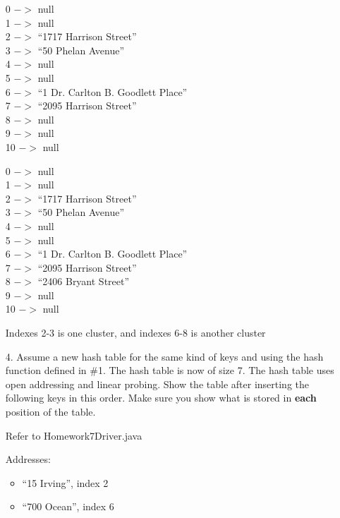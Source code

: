\documentclass[10pt]{article}
\begin{document}
\begin{enumerate}
			\vspace{0.5cm}
			0 $->$ null\\
			1 $->$ null\\
			2 $->$ ``1717 Harrison Street''\\
			3 $->$ ``50 Phelan Avenue''\\
			4 $->$ null\\
			5 $->$ null\\
			6 $->$ ``1 Dr. Carlton B. Goodlett Place''\\
			7 $->$ ``2095 Harrison Street''\\
			8 $->$ null\\
			9 $->$ null\\
			10 $->$ null
			
			\vspace{0.5cm}
			0 $->$ null\\
			1 $->$ null\\
			2 $->$ ``1717 Harrison Street''\\
			3 $->$ ``50 Phelan Avenue''\\
			4 $->$ null\\
			5 $->$ null\\
			6 $->$ ``1 Dr. Carlton B. Goodlett Place''\\
			7 $->$ ``2095 Harrison Street''\\
			8 $->$ ``2406 Bryant Street''\\
			9 $->$ null\\
			10 $->$ null
			
			\vspace{0.5cm}
			Indexes 2-3 is one cluster, and indexes 6-8 is another cluster
		
		\item[4.] Assume a new hash table for the same kind of keys and using the hash function defined in \#1. The hash table is now of size 7. The hash table uses open addressing and linear probing. Show the table after inserting the following keys in this order. Make sure you show what is stored in \textbf{each} position of the table.
		
			\vspace{0.5cm}
			Refer to Homework7Driver.java
			
			\vspace{0.5cm}
			Addresses:
			\begin{itemize}
				\item ``15 Irving'', index 2
				
				\item ``700 Ocean'', index 6
				

\end{itemize}
\end{enumerate}
\end{document}
